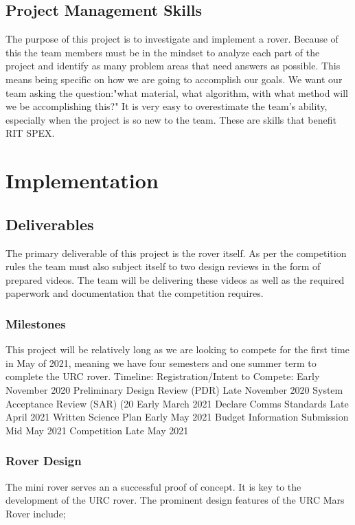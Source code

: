 \documentclass[conference]{IEEEtran} %
\begin{document}
\subsection{Project Management Skills}
\label{subsec:project-management}
The purpose of this project is to investigate and implement a rover. Because of this the team members must be in the mindset to analyze each part of the project and identify as many problem areas that need answers as possible. This means being specific on how we are going to accomplish our goals. We want our team asking the question:"what material, what algorithm, with what method will we be accomplishing this?" It is very easy to overestimate the team's ability, especially when the project is so new to the team. These are skills that benefit RIT SPEX.

\section{Implementation}
\label{sec:implementation}

\subsection{Deliverables}
\label{subsec:deliverables}
The primary deliverable of this project is the rover itself. As per the competition rules the team must also subject itself to two design reviews in the form of prepared videos. The team will be delivering these videos as well as the required paperwork and documentation that the competition requires. 

\subsubsection{Milestones}
\label{milestones}
This project will be relatively long as we are looking to compete for the first time in May of 2021, meaning we have four semesters and one summer term to complete the URC rover. 
Timeline:
Registration/Intent to Compete: 
Early November 2020
Preliminary Design Review (PDR)
Late November 2020
System Acceptance Review (SAR) (20%
Early March 2021
Declare Comms Standards
Late April 2021
Written Science Plan
Early May 2021
Budget Information Submission
Mid May 2021
Competition
Late May 2021

\subsubsection{Rover Design}
\label{roverdesign}
The mini rover serves an  a successful  proof of concept. It is key to the development of the URC rover. The prominent design features of the URC Mars Rover include;
\end{document}
